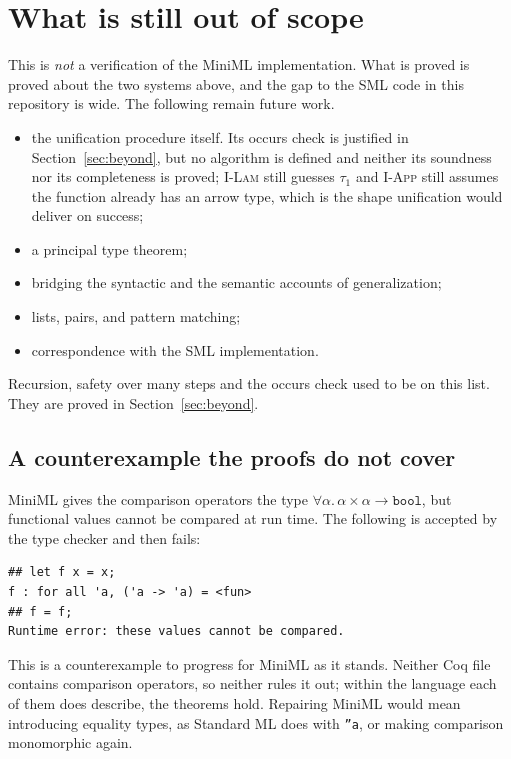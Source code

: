 \documentclass[11pt,a4paper]{article}
\newcommand{\tbool}{\mathtt{bool}}
\begin{document}
\section{What is still out of scope}
\label{sec:limits}

This is \emph{not} a verification of the MiniML implementation.  What is proved
is proved about the two systems above, and the gap to the SML code in this
repository is wide.  The following remain future work.

\begin{itemize}
  \item the unification procedure itself.  Its occurs check is justified in
  Section~\ref{sec:beyond}, but no algorithm is defined and neither its
  soundness nor its completeness is proved; \textsc{I-Lam} still guesses
  $\tau_1$ and \textsc{I-App} still assumes the function already has an arrow
  type, which is the shape unification would deliver on success;
  \item a principal type theorem;
  \item bridging the syntactic and the semantic accounts of generalization;
  \item lists, pairs, and pattern matching;
  \item correspondence with the SML implementation.
\end{itemize}

Recursion, safety over many steps and the occurs check used to be on this list.
They are proved in Section~\ref{sec:beyond}.

\subsection{A counterexample the proofs do not cover}

MiniML gives the comparison operators the type
$\forall\alpha.\,\alpha \times \alpha \to \tbool$, but functional values cannot
be compared at run time.  The following is accepted by the type checker and
then fails:

\begin{lstlisting}
## let f x = x;
f : for all 'a, ('a -> 'a) = <fun>
## f = f;
Runtime error: these values cannot be compared.
\end{lstlisting}

This is a counterexample to progress for MiniML as it stands.  Neither Coq file
contains comparison operators, so neither rules it out; within the language
each of them does describe, the theorems hold.  Repairing MiniML would mean
introducing equality types, as Standard ML does with \texttt{''a}, or making
comparison monomorphic again.
\end{document}
